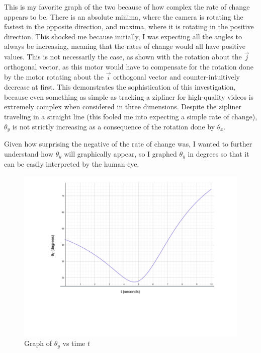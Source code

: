 \documentclass[12pt]{article}
\begin{document}
This is my favorite graph of the two because of how complex the rate of change appears to be. There is an absolute minima, where the camera is rotating the fastest in the opposite direction, and maxima, where it is rotating in the positive direction. This shocked me because initially, I was expecting all the angles to always be increasing, meaning that the rates of change would all have positive values. This is not necessarily the case, as shown with the rotation about the $\vec j$ orthogonal vector, as this motor would have to compensate for the rotation done by the motor rotating about the $\vec i$ orthogonal vector and counter-intuitively decrease at first. This demonstrates the sophistication of this investigation, because even something as simple as tracking a zipliner for high-quality videos is extremely complex when considered in three dimensions. Despite the zipliner traveling in a straight line (this fooled me into expecting a simple rate of change), $\theta_y$ is not strictly increasing as a consequence of the rotation done by $\theta_x$. 

Given how surprising the negative of the rate of change was, I wanted to further understand how $\theta_y$ will graphically appear, so I graphed $\theta_y$ in degrees so that it can be easily interpreted by the human eye.

\begin{figure}[H]
\centering
\includegraphics[width=500pt]{img/minigraph.png}
\vspace{-80pt}
\caption{\label{fig:6}Graph of $\theta_y$ vs time $t$}
\end{figure}
\end{document}
